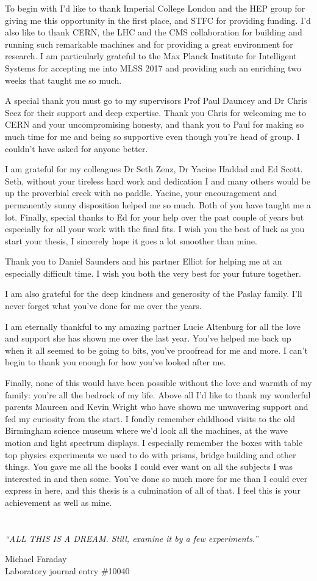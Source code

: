 To begin with I'd like to thank Imperial College London and the HEP group for giving me this opportunity in the first place, and STFC for providing funding.
I'd also like to thank CERN, the LHC and the CMS collaboration for building and running such remarkable machines and for providing a great environment for research.
I am particularly grateful to the Max Planck Institute for Intelligent Systems for accepting me into MLSS 2017 and providing such an enriching two weeks that taught me so much. 

A special thank you must go to my supervisors Prof Paul Dauncey and Dr Chris Seez for their support and deep expertise.
Thank you Chris for welcoming me to CERN and your uncompromising honesty, and thank you to Paul for making so much time for me and being so supportive even though you're head of group. I couldn't have asked for anyone better.

I am grateful for my colleagues Dr Seth Zenz, Dr Yacine Haddad and Ed Scott. 
Seth, without your tireless hard work and dedication I and many others would be up the proverbial creek with no paddle.
Yacine, your encouragement and permanently sunny disposition helped me so much. Both of you have taught me a lot. 
Finally, special thanks to Ed for your help over the past couple of years but especially for all your work with the final fits. 
I wish you the best of luck as you start your thesis, I sincerely hope it goes a lot smoother than mine. 

Thank you to Daniel Saunders and his partner Elliot for helping me at an especially difficult time.
I wish you both the very best for your future together.

I am also grateful for the deep kindness and generosity of the Paslay family. 
I'll never forget what you've done for me over the years. 

I am eternally thankful to my amazing partner Lucie Altenburg for all the love and support she has shown me over the last year. 
You've helped me back up when it all seemed to be going to bits, you've proofread for me and more. 
I can't begin to thank you enough for how you've looked after me. 

Finally, none of this would have been possible without the love and warmth of my family: you're all the bedrock of my life.
Above all I'd like to thank my wonderful parents Maureen and Kevin Wright who have shown me unwavering support and fed my curiosity from the start.
I fondly remember childhood visits to the old Birmingham science museum where we'd look all the machines, at the wave motion and light spectrum displays.
I especially remember the boxes with table top physics experiments we used to do with prisms, bridge building and other things. 
You gave me all the books I could ever want on all the subjects I was interested in and then some. 
You've done so much more for me than I could ever express in here, and this thesis is a culmination of all of that. 
I feel this is your achievement as well as mine. 

\tableofcontents
\listoffigures
\listoftables
%
\chapter*{\centering }
\begin{center}
\epigraph{\textit{``ALL THIS IS A DREAM. Still, examine it by a few experiments.''}}{Michael Faraday\\ Laboratory journal entry \#10040}
\end{center}

\cleardoublepage
